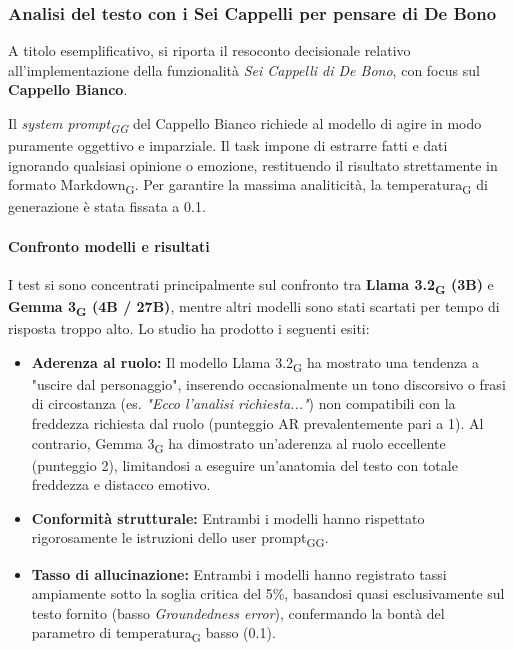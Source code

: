 \documentclass[11pt,a4paper]{article}
\newcommand{\gls}[1]{#1\textsubscript{G}}
\begin{document}
\subsubsection{Analisi del testo con i Sei Cappelli per pensare di De Bono}
A titolo esemplificativo, si riporta il resoconto decisionale relativo all'implementazione della funzionalità \textit{Sei Cappelli di De Bono}, con focus sul \textbf{Cappello Bianco}.

Il \textit{\gls{system \gls{prompt}}} del Cappello Bianco richiede al modello di agire in modo puramente oggettivo e imparziale. Il task impone di estrarre fatti e dati ignorando qualsiasi opinione o emozione, restituendo il risultato strettamente in formato \gls{Markdown}. Per garantire la massima analiticità, la \gls{temperatura} di generazione è stata fissata a 0.1.

\paragraph{Confronto modelli e risultati}
I test si sono concentrati principalmente sul confronto tra \textbf{\gls{Llama 3.2} (3B)} e \textbf{\gls{Gemma 3} (4B / 27B)}, mentre altri modelli sono stati scartati per tempo di risposta troppo alto. Lo studio ha prodotto i seguenti esiti:
\begin{itemize}
    \item \textbf{Aderenza al ruolo:} Il modello \gls{Llama 3.2} ha mostrato una tendenza a "uscire dal personaggio", inserendo occasionalmente un tono discorsivo o frasi di circostanza (es. \textit{"Ecco l'analisi richiesta..."}) non compatibili con la freddezza richiesta dal ruolo (punteggio AR prevalentemente pari a 1). Al contrario, \gls{Gemma 3} ha dimostrato un'aderenza al ruolo eccellente (punteggio 2), limitandosi a eseguire un'anatomia del testo con totale freddezza e distacco emotivo.
    
    \item \textbf{Conformità strutturale:} Entrambi i modelli hanno rispettato rigorosamente le istruzioni dello \gls{user \gls{prompt}}.
    
    \item \textbf{Tasso di allucinazione:} Entrambi i modelli hanno registrato tassi ampiamente sotto la soglia critica del 5\%, basandosi quasi esclusivamente sul testo fornito (basso \textit{Groundedness error}), confermando la bontà del parametro di \gls{temperatura} basso (0.1).
\end{itemize}
\end{document}
